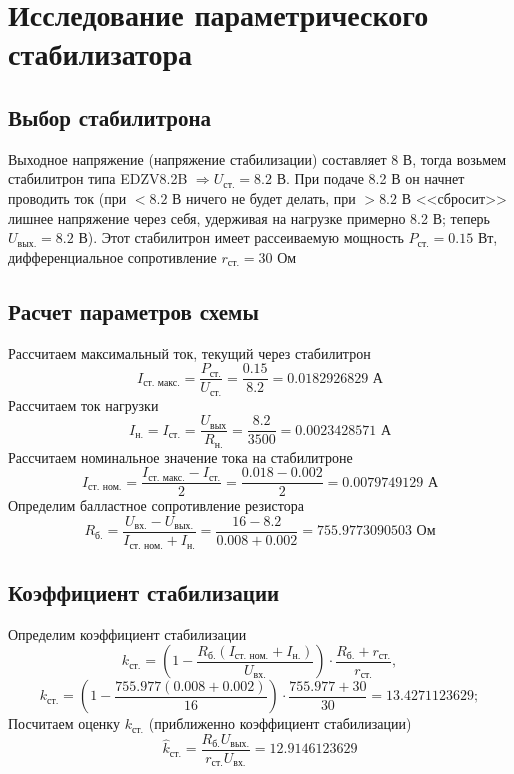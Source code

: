 \documentclass[a4paper, 12pt]{article}
\begin{document}
    \section{Исследование параметрического стабилизатора}
    \subsection{Выбор стабилитрона}
    Выходное напряжение (напряжение стабилизации) составляет 8 В, тогда возьмем стабилитрон типа EDZV8.2B $\Rightarrow U_{\text{ст.}}=8.2$ В.
    При подаче 8.2 В он начнет проводить ток (при $<8.2$ В ничего не будет делать, при $>8.2$ В <<сбросит>>
    лишнее напряжение через себя, удерживая на нагрузке примерно 8.2 В; теперь $U_{\text{вых.}}=8.2$ В). Этот стабилитрон имеет рассеиваемую
    мощность $P_\text{ст.}=0.15$ Вт, дифференциальное сопротивление $r_{\text{ст.}}=30$ Ом
    
    
    \subsection{Расчет параметров схемы}
    Рассчитаем максимальный ток, текущий
    через стабилитрон
    $$
    I_{\text{ст. макс.}}=\dfrac{P_{\text{ст.}}}{U_{\text{ст.}}}=\dfrac{0.15}{8.2}=0.0182926829\text{ А}
    $$
    Рассчитаем ток нагрузки
    $$
    I_{\text{н.}}=I_{\text{ст.}}=\dfrac{U_{\text{вых}}}{R_{\text{н.}}}=\dfrac{8.2}{3500}=0.0023428571\text{ А}
    $$
    Рассчитаем номинальное значение тока на стабилитроне
    $$
    I_{\text{ст. ном.}}=\dfrac{I_{\text{ст. макс.}}-I_{\text{ст.}}}{2}=\dfrac{0.018-0.002}{2}=0.0079749129\text{ А}
    $$
    Определим балластное сопротивление резистора
    $$
    R_{\text{б.}}=\dfrac{U_{\text{вх.}}-U_{\text{вых.}}}{I_{\text{ст. ном.}}+I_{\text{н.}}}=\dfrac{16-8.2}{0.008+0.002}=755.9773090503\text{ Ом}
    $$


    \subsection{Коэффициент стабилизации}
    Определим коэффициент стабилизации
    $$
    k_{\text{ст.}}=\left( 1-\dfrac{R_{\text{б.}}\left( I_\text{ст. ном.}+I_{\text{н.}} \right)}{U_{\text{вх.}}} \right)\cdot\dfrac{R_{\text{б.}}+r_{\text{ст.}}}{r_{\text{ст.}}},
    $$
    $$
    k_{\text{ст.}}=\left( 1-\dfrac{755.977\left( 0.008+0.002 \right)}{16} \right)\cdot\dfrac{755.977+30}{30}=13.4271123629;
    $$
    Посчитаем оценку $k_{\text{ст.}}$ (приближенно коэффициент стабилизации)
    $$
    \hat{k}_{\text{ст.}}=\dfrac{R_{\text{б.}}U_{\text{вых.}}}{r_{\text{ст.}}U_{\text{вх.}}}=12.9146123629
    $$
\end{document}
